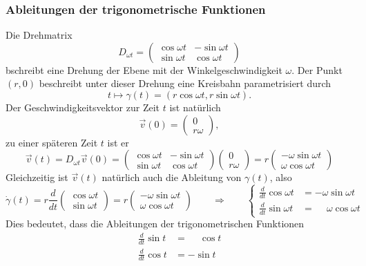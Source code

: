 \subsubsection{Ableitungen der trigonometrische Funktionen}
Die Drehmatrix 
\[
D_{\omega t}
=
\begin{pmatrix}
\cos\omega t&-\sin\omega t\\
\sin\omega t& \cos\omega t
\end{pmatrix}
\]
bschreibt eine Drehung der Ebene mit der Winkelgeschwindigkeit 
$\omega$.
Der Punkt $(r,0)$ beschreibt unter dieser Drehung eine Kreisbahn
parametrisiert durch 
\[
t \mapsto \gamma(t)=(r\cos\omega t,r\sin\omega t).
\]
Der Geschwindigkeitsvektor zur Zeit $t$ ist natürlich
\[
\vec{v}(0)
=
\begin{pmatrix}
0\\
r\omega
\end{pmatrix},
\]
zu einer späteren Zeit $t$  ist er
\[
\vec{v}(t)
=
D_{\omega t} \vec{v}(0)
=
\begin{pmatrix}
\cos\omega t&-\sin\omega t\\
\sin\omega t& \cos\omega t
\end{pmatrix}
\begin{pmatrix}
0\\r\omega
\end{pmatrix}
=
r
\begin{pmatrix}
-\omega\sin\omega t\\
 \omega\cos\omega t
\end{pmatrix}
\]
Gleichzeitig ist $\vec{v}(t)$ natürlich auch die Ableitung  von $\gamma(t)$,
also
\[
\dot{\gamma}(t)
=
r
\frac{d}{dt}
\begin{pmatrix}
\cos\omega t\\
\sin\omega t
\end{pmatrix}
=
r
\begin{pmatrix}
-\omega\sin\omega t\\
 \omega\cos\omega t
\end{pmatrix}
\qquad\Rightarrow\qquad
\left\{
\begin{aligned}
\frac{d}{dt} \cos\omega t &= -\omega \sin\omega t\\
\frac{d}{dt} \sin\omega t &= \phantom{-} \omega \cos\omega t
\end{aligned}
\right.
\]
Dies bedeutet, dass die Ableitungen der trigonometrischen Funktionen
\begin{equation}
\begin{aligned}
\frac{d}{dt} \sin t&=\phantom{-}\cos t\\
\frac{d}{dt} \cos t&=-\sin t
\end{aligned}
\label{buch:differentialgleichungen:trigo:ableitungen}
\end{equation}

